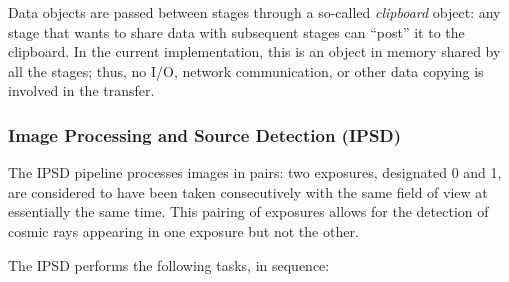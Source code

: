 Data objects are passed between stages through a so-called
\textit{clipboard} object:  any stage that wants to share data with
subsequent stages can ``post'' it to the clipboard.  In the current
implementation, this is an object in memory shared by all the stages;
thus, no I/O, network communication, or other data copying is involved
in the transfer. 

\subsubsection{Image Processing and Source Detection (IPSD)}

The IPSD pipeline processes images in pairs: two exposures, designated
0 and 1, are considered to have been taken consecutively with the same
field of view at essentially the same time. This pairing of exposures
allows for the detection of cosmic rays appearing in one exposure but
not the other.

The IPSD performs the following tasks, in sequence:

